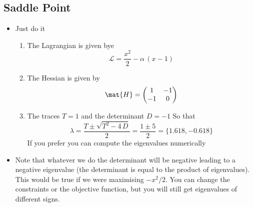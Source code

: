 \documentclass[11pt]{article}
\begin{document}
\subsection{Saddle Point}
\label{sec:org59cd79d}
\begin{itemize}
\item Just do it
\begin{enumerate}
\item The Lagrangian is given bye
$$ \mathcal{L} = \frac{x^2}{2} - \alpha\, (x-1) $$
\item The Hessian is given by
$$ \mat{H} = \begin{pmatrix} 1 & -1 \\ -1 &0 \end{pmatrix} $$
\item The traces \(T = 1\) and the determinant \(D = -1\) So that
$$ \lambda = \frac{T \pm \sqrt{T^2 - 4\, D}}{2} = \frac{1
	\pm{5}}{2} = \{1.618, -0.618\} $$
If you prefer you can compute the eigenvalues numerically
\end{enumerate}
\item Note that whatever we do the determinant will be negative leading
to a negative eigenvalue (the determinant is equal to the product
of eigenvalues).   This would be true if we were maximising
\(-x^2/2\).  You can change the constraints or the objective
function, but you will still get eigenvalues of different signs.
\end{itemize}
\end{document}
